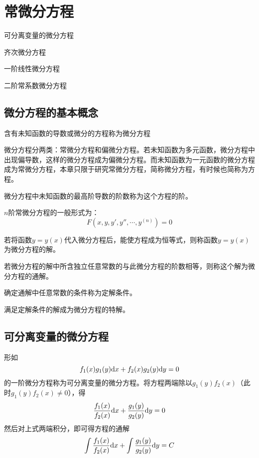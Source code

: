 \setcounter{chapter}{11}

\chapter{常微分方程}

\begin{introduction}
    \item 可分离变量的微分方程
    \item 齐次微分方程
    \item 一阶线性微分方程
    \item 二阶常系数微分方程
\end{introduction}

\section{微分方程的基本概念}
含有未知函数的导数或微分的方程称为微分方程

微分方程分两类：常微分方程和偏微分方程。若未知函数为多元函数，微分方程中出现偏导数，这样的微分方程成为偏微分方程。而未知函数为一元函数的微分方程成为常微分方程，本章只限于研究常微分方程，简称微分方程，有时候也简称为方程。

微分方程中未知函数的最高阶导数的阶数称为这个方程的阶。

$n$阶常微分方程的一般形式为：
\begin{equation*}
    F(x,y,y',y'',\cdots,y^{(n)})=0
\end{equation*}

若将函数$y=y(x)$代入微分方程后，能使方程成为恒等式，则称函数$y=y(x)$为微分方程的解。

若微分方程的解中所含独立任意常数的与此微分方程的阶数相等，则称这个解为微分方程的通解。

确定通解中任意常数的条件称为定解条件。

满足定解条件的解成为微分方程的特解。

\section{可分离变量的微分方程}
形如
\begin{equation*}
    f_1(x)g_1(y)\mathrm{d} x+f_2(x)g_2(y)\mathrm{d} y=0
\end{equation*}
的一阶微分方程称为可分离变量的微分方程。将方程两端除以$g_1(y)f_2(x)$（此时$g_1(y)f_2(x)\neq0$），得
\begin{equation*}
    \dfrac{f_1(x)}{f_2(x)}\mathrm{d} x+\dfrac{g_1(y)}{g_2(y)}\mathrm{d} y=0
\end{equation*}
然后对上式两端积分，即可得方程的通解
\begin{equation*}
    \int\dfrac{f_1(x)}{f_2(x)}\mathrm{d} x+\int\dfrac{g_1(y)}{g_2(y)}\mathrm{d} y=C
\end{equation*}


